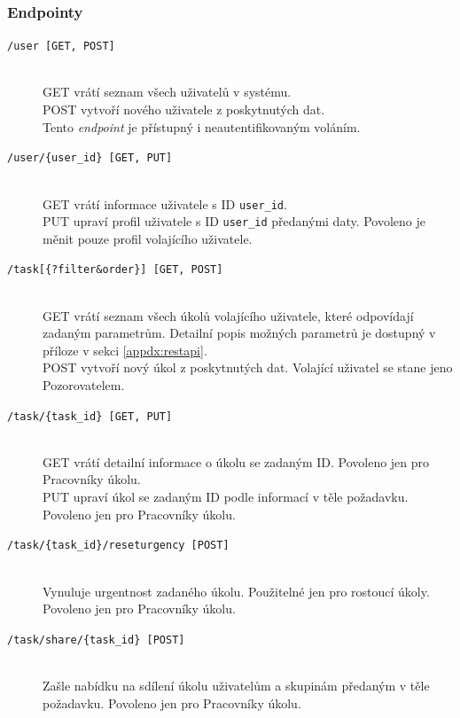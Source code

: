 \documentclass[thesis=B,czech]{FITthesis}[2012/06/26]
\newcommand{\forworkers}{Povoleno jen pro Pracovníky úkolu.}
\begin{document}
			
			\subsubsection{Endpointy}
			\label{sec:rest-api}
			\begin{description}			
			\item[\texttt{/user [GET, POST]}] \hfill \\
				GET vrátí seznam všech uživatelů v systému. \\
				POST vytvoří nového uživatele z poskytnutých dat. \\
				
				Tento \textit{endpoint} je přístupný i neautentifikovaným voláním.
				
			\item[\texttt{/user/\{user\_id\} [GET, PUT]}] \hfill \\
				GET vrátí informace uživatele s ID \texttt{user\_id}. \\
				PUT upraví profil uživatele s ID \texttt{user\_id} předanými daty. Povoleno je měnit pouze profil volajícího uživatele.
			
			\item[\texttt{/task[\{?filter\&order\}] [GET, POST]}] \hfill \\
				GET vrátí seznam všech úkolů volajícího uživatele, které odpovídají zadaným parametrům. Detailní popis možných parametrů je dostupný v příloze v sekci \ref{appdx:restapi}. \\
				POST vytvoří nový úkol z poskytnutých dat. Volající uživatel se stane jeno Pozorovatelem.
			
			\item[\texttt{/task/\{task\_id\} [GET, PUT]}] \hfill \\
				GET vrátí detailní informace o úkolu se zadaným ID. \forworkers \\
				PUT upraví úkol se zadaným ID podle informací v těle požadavku. \forworkers
			
			\item[\texttt{/task/\{task\_id\}/reseturgency [POST]}] \hfill \\
				Vynuluje urgentnost zadaného úkolu. Použitelné jen pro rostoucí úkoly. \forworkers
			
			\item[\texttt{/task/share/\{task\_id\} [POST]}] \hfill \\
				Zašle nabídku na sdílení úkolu uživatelům a skupinám předaným v těle požadavku. \forworkers
			

\end{description}
\end{document}
